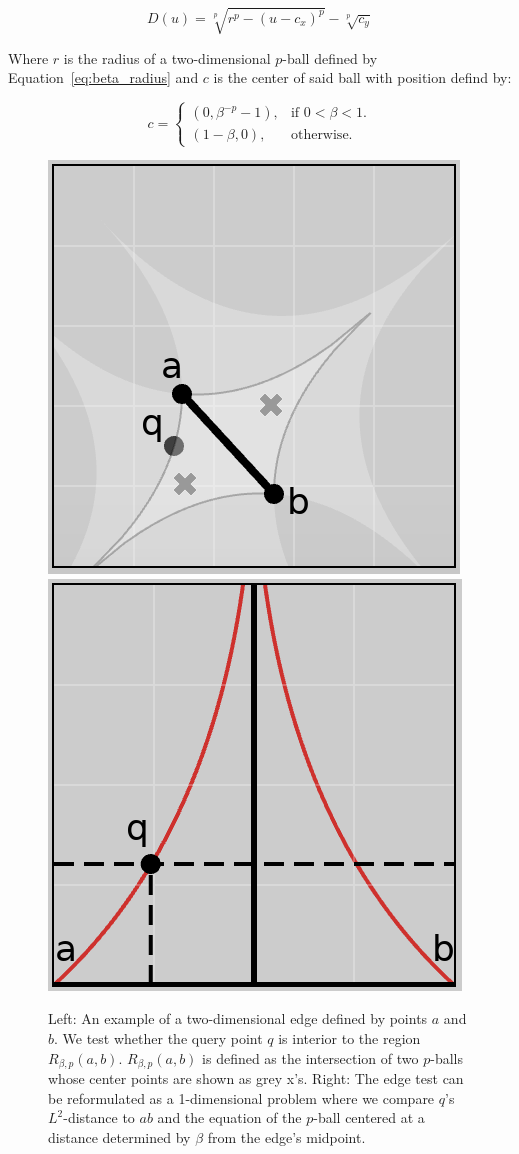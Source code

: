 \begin{equation}
    \label{eq:beta_parameterization}
    D(u) = \sqrt[p]{r^{p} - (u - c_x)^p} - \sqrt[p]{c_y}
\end{equation}

Where $r$ is the radius of a two-dimensional $p$-ball defined by Equation~\ref{eq:beta_radius} and $c$ is the center of said ball with position defind by:

\begin{equation}
    c =
    \begin{cases}
        \left(0, \beta^{-p} - 1\right), & \text{if $0 < \beta < 1$}.\\
       \left(1-\beta, 0\right), & \text{otherwise}.
    \end{cases}
\end{equation}

\begin{figure}[htbp]
    \includegraphics[width=0.48\linewidth]{figs/chap7/bskeleton.png}
    \includegraphics[width=0.48\linewidth]{figs/chap7/bskeletonParameter.png}
    \caption{Left: An example of a two-dimensional edge defined by points $a$ and $b$.
    We test whether the query point $q$ is interior to the region $R_{\beta,p}(a,b)$.
    $R_{\beta,p}(a,b)$ is defined as the intersection of two $p$-balls whose center points are shown as grey x's.
    Right: The edge test can be reformulated as a 1-dimensional problem where we compare $q$'s $L^2$-distance to $ab$ and the equation of the $p$-ball centered at a distance determined by $\beta$ from the edge's midpoint.}
    \label{fig:gabriel_p_shapes}
\end{figure}

